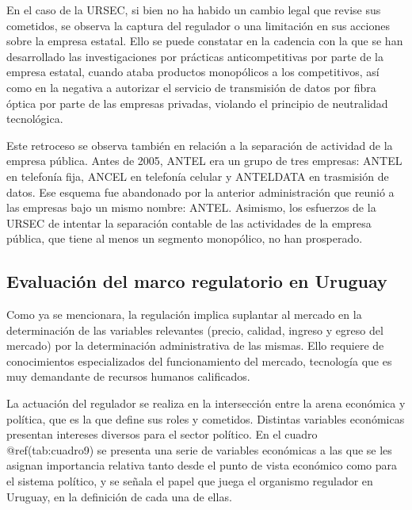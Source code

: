 \documentclass[
  12pt,
  spanish,
]{book}
\begin{document}
En el caso de la URSEC, si bien no ha habido un cambio legal que revise
sus cometidos, se observa la captura del regulador o una limitación en
sus acciones sobre la empresa estatal. Ello se puede constatar en la
cadencia con la que se han desarrollado las investigaciones por
prácticas anticompetitivas por parte de la empresa estatal, cuando ataba
productos monopólicos a los competitivos, así como en la negativa a
autorizar el servicio de transmisión de datos por fibra óptica por parte
de las empresas privadas, violando el principio de neutralidad
tecnológica.

Este retroceso se observa también en relación a la separación de
actividad de la empresa pública. Antes de 2005, ANTEL era un grupo de
tres empresas: ANTEL en telefonía fija, ANCEL en telefonía celular y
ANTELDATA en trasmisión de datos. Ese esquema fue abandonado por la
anterior administración que reunió a las empresas bajo un mismo nombre:
ANTEL. Asimismo, los esfuerzos de la URSEC de intentar la separación
contable de las actividades de la empresa pública, que tiene al menos un
segmento monopólico, no han prosperado.

\hypertarget{evaluaciuxf3n-del-marco-regulatorio-en-uruguay}{%
\subsection{Evaluación del marco regulatorio en
Uruguay}\label{evaluaciuxf3n-del-marco-regulatorio-en-uruguay}}

Como ya se mencionara, la regulación implica suplantar al mercado en la
determinación de las variables relevantes (precio, calidad, ingreso y
egreso del mercado) por la determinación administrativa de las mismas.
Ello requiere de conocimientos especializados del funcionamiento del
mercado, tecnología que es muy demandante de recursos humanos
calificados.

La actuación del regulador se realiza en la intersección entre la arena
económica y política, que es la que define sus roles y cometidos.
Distintas variables económicas presentan intereses diversos para el
sector político. En el cuadro @ref(tab:cuadro9) se presenta una serie de
variables económicas a las que se les asignan importancia relativa tanto
desde el punto de vista económico como para el sistema político, y se
señala el papel que juega el organismo regulador en Uruguay, en la
definición de cada una de ellas.
\end{document}
